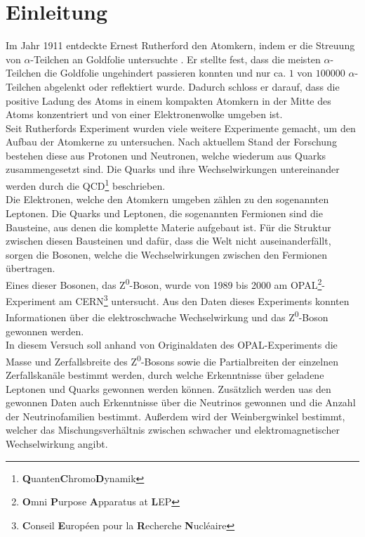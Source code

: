 \section{Einleitung}

Im Jahr 1911 entdeckte Ernest Rutherford den Atomkern, indem er die Streuung von $\alpha$-Teilchen an Goldfolie untersuchte \cite{rutherford}. Er stellte fest, dass die meisten $\alpha$-Teilchen die Goldfolie ungehindert passieren konnten und nur ca. $1$ von $100000$ $\alpha$-Teilchen abgelenkt oder reflektiert wurde. Dadurch schloss er darauf, dass die positive Ladung des Atoms in einem kompakten Atomkern in der Mitte des Atoms konzentriert und von einer Elektronenwolke umgeben ist.\\

Seit Rutherfords Experiment wurden viele weitere Experimente gemacht, um den Aufbau der Atomkerne zu untersuchen. Nach aktuellem Stand der Forschung bestehen diese aus Protonen und Neutronen, welche wiederum aus Quarks zusammengesetzt sind. Die Quarks und ihre Wechselwirkungen untereinander werden durch die QCD\footnote{\textbf{Q}uanten\textbf{C}hromo\textbf{D}ynamik} beschrieben.\\

Die Elektronen, welche den Atomkern umgeben zählen zu den sogenannten Leptonen. Die Quarks und Leptonen, die sogenannten Fermionen sind die Bausteine, aus denen die komplette Materie aufgebaut ist. Für die Struktur zwischen diesen Bausteinen und dafür, dass die Welt nicht auseinanderfällt, sorgen die Bosonen, welche die Wechselwirkungen zwischen den Fermionen übertragen.\\

Eines dieser Bosonen, das Z\textsuperscript0-Boson, wurde von 1989 bis 2000 am OPAL\footnote{\textbf Omni \textbf Purpose \textbf Apparatus at \textbf LEP}-Experiment am CERN\footnote{\textbf{C}onseil \textbf{E}uropéen pour la \textbf{R}echerche \textbf{N}ucléaire} untersucht. Aus den Daten dieses Experiments konnten Informationen über die elektroschwache Wechselwirkung und das Z\textsuperscript0-Boson gewonnen werden.\\

In diesem Versuch soll anhand von Originaldaten des OPAL-Experiments die Masse und Zerfallsbreite des Z\textsuperscript0-Bosons sowie die Partialbreiten der einzelnen Zerfallskanäle bestimmt werden, durch welche Erkenntnisse über geladene Leptonen und Quarks gewonnen werden können. Zusätzlich werden uas den gewonnen Daten auch Erkenntnisse über die Neutrinos gewonnen und die Anzahl der Neutrinofamilien bestimmt. Außerdem wird der Weinbergwinkel bestimmt, welcher das Mischungsverhältnis zwischen schwacher und elektromagnetischer Wechselwirkung angibt.